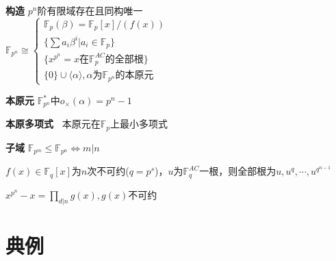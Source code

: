 \documentclass[b4paper, 10pt]{ctexart}
\newcommand*{\bb}[1]{\mathbb{#1}}
\renewcommand*{\iff}{\Leftrightarrow}
\renewcommand*{\leq}{\leqslant}
\newcommand*{\genfield}[1]{\langle #1 \rangle}
\newcommand*{\ff}[1]{\bb{F}_{#1}}
\begin{document}
\begin{multicols}{3}
    \textbf{构造} $p^n$阶有限域存在且同构唯一\\
    $\ff{p^n} \cong \begin{cases}
            \ff{p}(\beta) = \ff{p}[x]/(f(x))          \\
            \{\sum a_i \beta^i | a_i \in \ff{p}\}     \\
            \{x^{p^n} = x \text{在$\ff{p}^{AC}$的全部根}\} \\
            \{0\} \cup \genfield{\alpha}, \alpha\text{为$\ff{p^n}$的本原元}
        \end{cases}$

    \textbf{本原元} $\ff{p^n}^*$中$o_\times(\alpha) = p^n - 1$

    \textbf{本原多项式\ } 本原元在$\ff{p}$上最小多项式

    \textbf{子域} $\ff{p^m} \leq \ff{p^n} \iff m | n$

    \begin{theorem}[多项式根]
        $f(x) \in \ff{q}[x]$为$n$次不可约($q=p^s$)，$u$为$\ff{q}^{AC}$一根，则全部根为$u, u^q,\cdots,u^{q^{n-1}}$
    \end{theorem}

    \begin{theorem}[一篮子分解]
        $x^{p^n} \! - \! x \! = \! \prod\limits_{d|n} g(x), g(x)$不可约
    \end{theorem}

    \section{典例}


\end{multicols}
\end{document}
